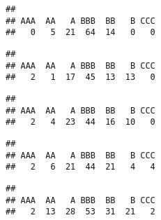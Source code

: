 \documentclass[
]{article}
\newenvironment{Shaded}{\begin{snugshade}}{\end{snugshade}}
\newcommand{\DecValTok}[1]{\textcolor[rgb]{0.00,0.00,0.81}{#1}}
\newcommand{\KeywordTok}[1]{\textcolor[rgb]{0.13,0.29,0.53}{\textbf{#1}}}
\newcommand{\NormalTok}[1]{#1}
\newcommand{\OperatorTok}[1]{\textcolor[rgb]{0.81,0.36,0.00}{\textbf{#1}}}
\begin{document}
\begin{verbatim}
## 
## AAA  AA   A BBB  BB   B CCC 
##   0   5  21  64  14   0   0
\end{verbatim}

\begin{Shaded}
\end{Shaded}

\begin{verbatim}
## 
## AAA  AA   A BBB  BB   B CCC 
##   2   1  17  45  13  13   0
\end{verbatim}

\begin{Shaded}
\end{Shaded}

\begin{verbatim}
## 
## AAA  AA   A BBB  BB   B CCC 
##   2   4  23  44  16  10   0
\end{verbatim}

\begin{Shaded}
\end{Shaded}

\begin{verbatim}
## 
## AAA  AA   A BBB  BB   B CCC 
##   2   6  21  44  21   4   4
\end{verbatim}

\begin{Shaded}
\end{Shaded}

\begin{verbatim}
## 
## AAA  AA   A BBB  BB   B CCC 
##   2  13  28  53  31  21   2
\end{verbatim}
\end{document}
